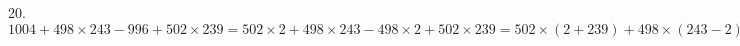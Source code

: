 20. $1004+498\times243-996+502\times239=502\times2+498\times243-498\times2+502\times239=502\times(2+239)+498\times(243-2)=502\times241+498\times241=
241\times(502+498)=241\times1000=241000.$\\

